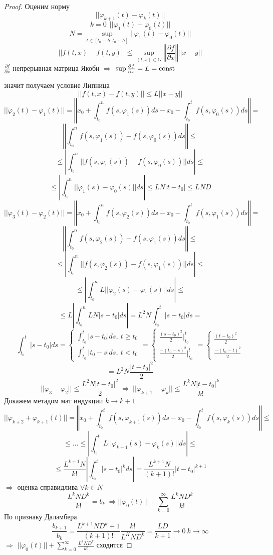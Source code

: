 \begin{proof}
  Оценим норму
  $$
  ||\varphi_{k+1}(t) - \varphi_k(t)||
  $$
  $$
  k = 0 ~~ ||\varphi_1(t) - \varphi_0(t)||
  $$
  $$
  N = \sup_{t \in [t_0 - h, t_0 + h]} ||\varphi_1(t) - \varphi_0(t)||
  $$
  $$
  ||f(t, x) - f(t,y)|| \le \sup_{(t,x ) \in G} \left\Vert \frac{\partial f}{
  \partial x} \right\Vert ||x-y||
  $$
  $\frac{\partial f}{\partial x}$ непрерывная матрица Якоби $\Rightarrow$
  $\sup \frac{\partial f}{\partial x} = L = \mathrm{const}$

  значит получаем условие Липница
  $$
  ||f(t,x) - f(t,y)|| \le L||x-y||
  $$
  $$
  ||\varphi_2(t) - \varphi_1(t)|| = \left\Vert x_0 + \int_{t_0}^n
  f(s, \varphi_1(s))ds - x_0 - \int_{t_0}^t f(s, \varphi_0(s))ds \right\Vert =
  $$
  $$
  \left\Vert \int_{t_0}^n f(s, \varphi_1(s)) - f(s, \varphi_0(s))ds \right\Vert
  \le
  $$
  $$
  \le \left| \int_{t_0}^n ||f(s, \varphi_1(s)) - f(s, \varphi_0(s))||ds
  \right| \le
  $$
  $$
  \le \left| \int_{t_0}^n ||\varphi_1(s) - \varphi_0(s)||ds \right| \le
  LN|t-t_0| \le LND
  $$
  $$
  ||\varphi_3(t) - \varphi_2(t)|| = \left\Vert x_0 + \int_{t_0}^n
  f(s, \varphi_2(s))ds - x_0 - \int_{t_0}^t f(s, \varphi_1(s))ds \right\Vert =
  $$
  $$
  \left\Vert \int_{t_0}^n f(s, \varphi_2(s)) - f(s, \varphi_1(s))ds \right\Vert
  \le
  $$
  $$
  \le \left| \int_{t_0}^n ||f(s, \varphi_2(s)) - f(s, \varphi_1(s))||ds
  \right| \le
  $$
  $$
  \le \left| \int_{t_0}^n L||\varphi_2(s) - \varphi_1(s)||ds \right| \le
  $$
  $$
  \le L \left| \int_{t_0}^n LN|s-t_0|ds \right| = L^2 N \int_{t_0}^t
  |s-t_0|ds =
  $$
  $$
  \int_{t_0}^t |s - t_0| ds =
  \left\{
  \begin{array}{l}
  \int_{t_0}^t |s - t_0| ds, ~ t \ge t_0 \\
  \int_{t_0}^t |t_0 - s| ds, ~ t < t_0
  \end{array}
  \right. =
  \left\{
  \begin{array}{l}
    \frac{(s - t_0)^2}{2}|_{t_0}^t \\
    \frac{-(t_0 - s)^2}{2}|_{t_0}^t
  \end{array}
  \right. =
  \left\{
  \begin{array}{l}
    \frac{(t - t_0)^2}{2} \\
    \frac{-(t_0 - t)^2}{2}
  \end{array}
  \right.
  $$
  $$
  = L^2N\frac{|t - t_0|^2}{2}
  $$
  $$
  ||\varphi_3 - \varphi_2|| \le \frac{L^2N|t-t_0|^2}{2} ~ \Rightarrow ~
  ||\varphi_{k+1} - \varphi_k|| \le \frac{L^kN|t-t_0|^k}{k!}
  $$
  Докажем метадом мат индукции $k \to k+1$
  $$
  ||\varphi_{k+2} + \varphi_{k+1}(t)|| = \left\Vert x_0 + \int_{t_0}^t
  f(s, \varphi_{k+1}(s))ds - x_0 - \int_{t_0}^t
  f(s, \varphi_k(s))ds\right\Vert \le
  $$
  $$
  \le \ldots \le \left| \int_{t_0}^t L||\varphi_{k+1}(s) - \varphi_k(s)||ds
  \right| \le
  $$
  $$
  \le \frac{L^{k+1}N}{k!}\left| \int_{t_0}^t |s - t_0|^k ds \right| =
  \frac{L^{k+1}N}{(k+1)!}|t-t_0|^{k+1}
  $$
  $\Rightarrow$ оценка справидлива $\forall k \in N$
  $$
  \frac{L^k N D^k}{k!} = b_k ~ \Rightarrow ||\varphi_0(t)|| +
  \sum_{k=0}^{\infty} \frac{L^kN D^k}{k!}
  $$
  По признаку Даламбера
  $$
  \frac{b_{k+1}}{b_k} = \frac{L^{k+1}ND^k+1}{(k+1)!} \frac{k!}{L^K N D^k} =
  \frac{LD}{k+1} \to 0 ~ k \to \infty
  $$
  $\Rightarrow$ $||\varphi_0(t)|| + \sum_{k=0}^{\infty} \frac{L^kND^k}{k!}$
  сходится


\end{proof}
